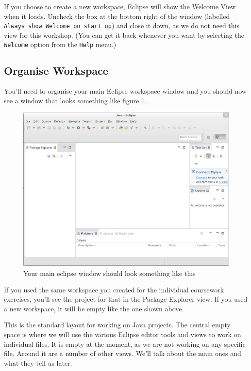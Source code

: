 \documentclass[
]{book}
\begin{document}
If you choose to create a new workspace, Eclipse will show the Welcome View when it loads. Uncheck the box at the bottom right of the window (labelled \texttt{Always\ show\ Welcome\ on\ start\ up}) and close it down, as we do not need this view for this workshop. (You can get it back whenever you want by selecting the \texttt{Welcome} option from the \texttt{Help} menu.)

\hypertarget{organisew}{%
\subsection{Organise Workspace}\label{organisew}}

You'll need to organise your main Eclipse workspace window and you should now see a window that looks something like figure \ref{fig:firstview-fig}.

\begin{figure}

{\centering \includegraphics[width=1\linewidth]{images/1.3.2firstView} 

}

\caption{Your main eclipse window should look something like this}\label{fig:firstview-fig}
\end{figure}

If you used the same workspace you created for the individual coursework exercises, you'll see the project for that in the Package Explorer view. If you used a new workspace, it will be empty like the one shown above.

This is the standard layout for working on Java projects. The central empty space is where we will use the various Eclipse editor tools and views to work on individual files. It is empty at the moment, as we are not working on any specific file. Around it are a number of other views. We'll talk about the main ones and what they tell us later.
\end{document}
